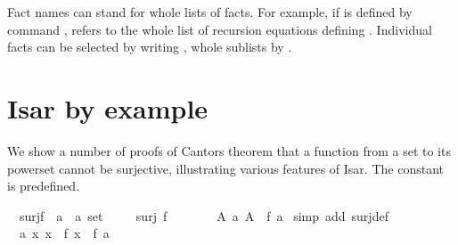 \begin{isabellebody}
\begin{isamarkuptext}
Fact names can stand for whole lists of facts. For example, if  is
defined by command ,  refers to the whole list of
recursion equations defining . Individual facts can be selected by
writing , whole sublists by .


\section{Isar by example}

We show a number of proofs of Cantors theorem that a function from a set to
its powerset cannot be surjective, illustrating various features of Isar. The
constant  is predefined.%
\end{isamarkuptext}%
\isamarkuptrue%
\isamarkupfalse%
\ {}{}\ surj{}f\ {}{}\ {}a\ {}\ {}a\ set{}{}\isanewline
%
\isadelimproof
%
\endisadelimproof
%
\isatagproof
{}\isamarkupfalse%
\isanewline
\ \ \isamarkupfalse%
\ {}{}\ {}surj\ f{}\isanewline
\ \ \isamarkupfalse%
\ {}\ \isamarkupfalse%
\ {}{}\ {}{}A{}\ {}a{}\ A\ {}\ f\ a{}\ \isamarkupfalse%
{}simp\ add{}\ surj{}def{}\isanewline
\ \ \isamarkupfalse%
\ {}\ \isamarkupfalse%
\ {}{}\ {}{}a{}\ {}x{}\ x\ {}\ f\ x{}\ {}\ f\ a{}\ \isamarkupfalse%

\end{isabellebody}
